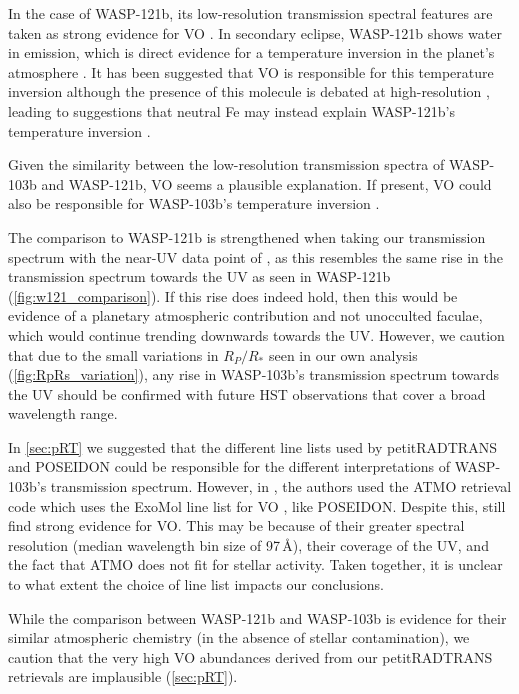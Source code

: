 \documentclass[twocolumn]{aastex63}
\begin{document}
In the case of WASP-121b, its low-resolution transmission spectral features are taken as strong evidence for VO \citep{Evans2016,Evans2018}. In secondary eclipse, WASP-121b shows water in emission, which is direct evidence for a temperature inversion in the planet's atmosphere \citep{Evans2017,Evans2019,Evans2020,Daylan2019,Bourrier2020}. It has been suggested that VO is responsible for this temperature inversion \citep{Evans2017,Evans2018,Evans2020,Daylan2019,Bourrier2020} although the presence of this molecule is debated at high-resolution \citep{Ben-Yami2020,Cabot2020,Hoeijmakers2020,Merritt2020,Borsa2021}, leading to suggestions that neutral Fe may instead explain WASP-121b's temperature inversion \citep{Gibson2020}.

Given the similarity between the low-resolution transmission spectra of WASP-103b and WASP-121b, VO seems a plausible explanation. If present, VO could also be responsible for WASP-103b's temperature inversion \citep{Kreidberg2018}. 

The comparison to WASP-121b is strengthened when taking our transmission spectrum with the near-UV data point of \cite{Turner2017}, as this resembles the same rise in the transmission spectrum towards the UV as seen in WASP-121b (\autoref{fig:w121_comparison}). If this rise does indeed hold, then this would be evidence of a planetary atmospheric contribution and not unocculted faculae, which would continue trending downwards towards the UV. However, we caution that due to the small variations in $R_P/R_*$ seen in our own analysis (\autoref{fig:RpRs_variation}), any rise in WASP-103b's transmission spectrum towards the UV should be confirmed with future HST observations that cover a broad wavelength range. 

In \autoref{sec:pRT} we suggested that the different line lists used by petitRADTRANS and POSEIDON could be responsible for the different interpretations of WASP-103b's transmission spectrum. However, in \cite{Evans2018}, the authors used the ATMO retrieval code which uses the ExoMol line list for VO \citep{Goyal2018}, like POSEIDON. Despite this, \cite{Evans2018} still find strong evidence for VO. This may be because of their greater spectral resolution (median wavelength bin size of 97\,\AA), their coverage of the UV, and the fact that ATMO does not fit for stellar activity. Taken together, it is unclear to what extent the choice of line list impacts our conclusions.

While the comparison between WASP-121b and WASP-103b is evidence for their similar atmospheric chemistry (in the absence of stellar contamination), we caution that the very high VO abundances derived from our petitRADTRANS retrievals are implausible (\autoref{sec:pRT}). 
\end{document}
